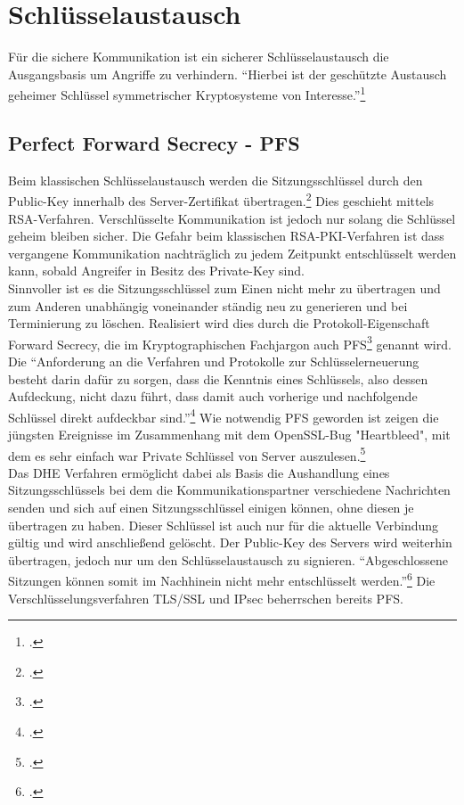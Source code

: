 \chapter{Schlüsselaustausch}
Für die sichere Kommunikation ist ein sicherer Schlüsselaustausch die Ausgangsbasis um Angriffe zu verhindern. ``Hierbei ist der geschützte Austausch geheimer Schlüssel symmetrischer Kryptosysteme von Interesse.''\footcite[S. 437]{Eckert2013} 
\section{Perfect Forward Secrecy - PFS}
Beim klassischen Schlüsselaustausch werden die Sitzungsschlüssel durch den Public-Key innerhalb des Server-Zertifikat übertragen.\footcite[Vgl.][]{Boeck2013} Dies geschieht mittels \ac{RSA}-Verfahren. Verschlüsselte Kommunikation ist jedoch nur solang die Schlüssel geheim bleiben sicher. Die Gefahr beim klassischen \ac{RSA}-\ac{PKI}-Verfahren ist dass vergangene Kommunikation nachträglich zu jedem Zeitpunkt entschlüsselt werden kann, sobald Angreifer in Besitz des Private-Key sind.\medskip\\
Sinnvoller ist es die Sitzungsschlüssel %
zum Einen nicht mehr zu übertragen und zum Anderen unabhängig voneinander ständig neu zu generieren und bei Terminierung zu löschen. Realisiert wird dies durch die Protokoll-Eigenschaft Forward Secrecy, die im Kryptographischen Fachjargon auch \ac{PFS}\footcite[Vgl.][]{Boeck2013} genannt wird. Die ``Anforderung an die Verfahren und Protokolle zur Schlüsselerneuerung besteht darin dafür zu sorgen, dass die Kenntnis eines Schlüssels, also dessen Aufdeckung, nicht dazu führt, dass damit auch vorherige und nachfolgende Schlüssel direkt aufdeckbar sind.''\footcite[S. 439]{Eckert2013} Wie notwendig \ac{PFS} geworden ist zeigen die jüngsten Ereignisse im Zusammenhang mit dem OpenSSL-Bug "Heartbleed", mit dem es sehr einfach war Private Schlüssel von Server auszulesen.\footcite[Vgl. ][]{Zhu2014} \medskip\\
Das \ac{DHE} Verfahren ermöglicht dabei als Basis die Aushandlung eines Sitzungsschlüssels bei dem die Kommunikationspartner verschiedene Nachrichten senden und sich auf einen Sitzungsschlüssel einigen können, ohne diesen je übertragen zu haben. Dieser Schlüssel ist auch nur für die aktuelle Verbindung gültig und wird anschließend gelöscht. Der Public-Key des Servers wird weiterhin übertragen, jedoch nur um den Schlüsselaustausch zu signieren. ``Abgeschlossene Sitzungen können somit im Nachhinein nicht mehr entschlüsselt werden.''\footcite[Vgl. ][]{Schulz2014} Die Verschlüsselungsverfahren \ac{TLS/SSL} und IPsec beherrschen bereits \ac{PFS}.\medskip\\

